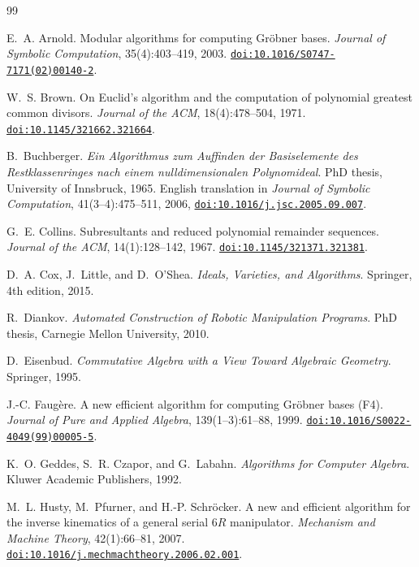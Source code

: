 \documentclass[11pt,a4paper]{article}
\theoremstyle{plain}
\theoremstyle{definition}
\theoremstyle{remark}
\newcommand{\doi}[1]{\href{https://doi.org/#1}{\nolinkurl{doi:#1}}}
\begin{document}
\begin{thebibliography}{99}

E.~A. Arnold.
\newblock Modular algorithms for computing Gr\"obner bases.
\newblock \emph{Journal of Symbolic Computation}, 35(4):403--419, 2003.
\newblock \doi{10.1016/S0747-7171(02)00140-2}.

W.~S. Brown.
\newblock On Euclid's algorithm and the computation of polynomial greatest common divisors.
\newblock \emph{Journal of the ACM}, 18(4):478--504, 1971.
\newblock \doi{10.1145/321662.321664}.

B.~Buchberger.
\newblock \emph{Ein Algorithmus zum Auffinden der Basiselemente des Restklassenringes nach einem
nulldimensionalen Polynomideal}.
\newblock PhD thesis, University of Innsbruck, 1965.
\newblock English translation in \emph{Journal of Symbolic Computation}, 41(3--4):475--511, 2006,
\doi{10.1016/j.jsc.2005.09.007}.

G.~E. Collins.
\newblock Subresultants and reduced polynomial remainder sequences.
\newblock \emph{Journal of the ACM}, 14(1):128--142, 1967.
\newblock \doi{10.1145/321371.321381}.

D.~A. Cox, J.~Little, and D.~O'Shea.
\newblock \emph{Ideals, Varieties, and Algorithms}.
\newblock Springer, 4th edition, 2015.

R.~Diankov.
\newblock \emph{Automated Construction of Robotic Manipulation Programs}.
\newblock PhD thesis, Carnegie Mellon University, 2010.

D.~Eisenbud.
\newblock \emph{Commutative Algebra with a View Toward Algebraic Geometry}.
\newblock Springer, 1995.

J.-C. Faug\`ere.
\newblock A new efficient algorithm for computing Gr\"obner bases (F4).
\newblock \emph{Journal of Pure and Applied Algebra}, 139(1--3):61--88, 1999.
\newblock \doi{10.1016/S0022-4049(99)00005-5}.

K.~O. Geddes, S.~R. Czapor, and G.~Labahn.
\newblock \emph{Algorithms for Computer Algebra}.
\newblock Kluwer Academic Publishers, 1992.

M.~L. Husty, M.~Pfurner, and H.-P. Schr\"ocker.
\newblock A new and efficient algorithm for the inverse kinematics of a general serial $6R$
manipulator.
\newblock \emph{Mechanism and Machine Theory}, 42(1):66--81, 2007.
\newblock \doi{10.1016/j.mechmachtheory.2006.02.001}.


\end{thebibliography}
\end{document}
